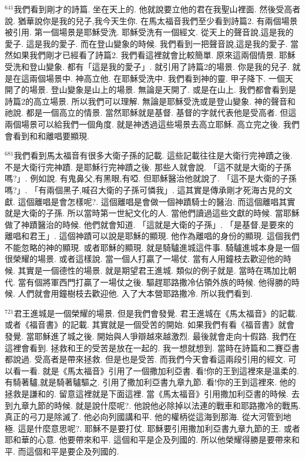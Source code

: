 \documentclass{book}
\begin{document}
$^{641}$我們看到剛才的詩篇.
坐在天上的.
他就說要立他的君在我聖山裡面.
然後受高者說.
猶華說你是我的兒子,我今天生你.
在馬太福音我們至少看到詩篇2.
有兩個場景被引用.
第一個場景是耶穌受洗.
耶穌受洗有一個經文.
從天上的聲音說,這是我的愛子.
這是我的愛子.
而在登山變象的時候.
我們看到一把聲音說,這是我的愛子.
當然如果我們剛才已經看了詩篇2.
我們看這裡就會比較簡單.
原來這兩個情景.
耶穌受洗和登山變象.
都有「這是我的愛子」.
就引用了詩篇2的場景.
你是我的兒子.
就是在這兩個場景中.
神高立他.
在耶穌受洗中.
我們看到神的靈.
甲子降下.
一個天開了的場景.
登山變象是山上的場景.
無論是天開了.
或是在山上.
我們都會看到是詩篇2的高立場景.
所以我們可以理解.
無論是耶穌受洗或是登山變象.
神的聲音和祂說.
都是一個高立的情景.
當然耶穌就是基督.
基督的字就代表他是受高者.
但這兩個場景可以給我們一個角度.
就是神透過這些場景去高立耶穌.
高立完之後.
我們會看到和和離唱要顯現.

$^{681}$我們看到馬太福音有很多大衛子孫的記載.
這些記載往往是大衛行完神蹟之後.
不是大衛行完神蹟.
是耶穌行完神蹟之後.
那些人就會說.
「這不就是大衛的子孫嗎?」.
例如說.
有鬼鼻父,有黑眼,有啞.
但耶穌醫治他就說了.
「這不是大衛的子孫嗎?」.
「有兩個黑子,喊召大衛的子孫可憐我」.
這其實是傳承剛才死海古見的文獻.
這個離唱是會怎樣呢?.
這個離唱是會做一個神蹟騎士的醫治.
而這個離唱其實就是大衛的子孫.
所以當時第一世紀文化的人.
當他們讀過這些文獻的時候.
當耶穌做了神蹟醫治的時候.
他們就會知道.
「這就是大衛的子孫」.
「是基督,是要來的離唱和君王」.
這個神蹟可以說是耶穌的顯現.
他作為離唱的身份的顯現.
這個我們不能忽略的神的顯現.
或者耶穌的顯現.
就是騎驢進城這件事.
騎驢進城本身是一個很榮耀的場景.
或者這樣說.
當一個人打贏了一場仗.
當有人用鐘枝去歡迎他的時候.
其實是一個德性的場景.
就是期望君王進城.
類似的例子就是.
當時在瑪加比朝代.
當有個將軍西門打贏了一場仗之後.
驅趕耶路撒冷佔領外族的時候.
他得勝的時候.
人們就會用鐘樹枝去歡迎他.
入了大本營耶路撒冷.
所以我們看到.

$^{721}$君王進城是一個榮耀的場景.
但是我們會發覺.
君王進城在《馬太福音》的記載.
或者《福音書》的記載.
其實就是一個受苦的開始.
如果我們有看《福音書》就會發覺.
當耶穌進了城之後.
開始與人爭辯越來越激烈.
最後就會走向十假路.
我們在這裡會看到.
拯救和王的受苦是放在一起的.
我一想就想到.
當時在詩篇和二賽亞書都說過.
受高者是帶來拯救.
但是也是受苦.
而我們今天會看這兩段引用的經文.
可以看一看.
就是《馬太福音》引用了一個撒加利亞書.
看!你的王到這裡來是溫柔的.
有騎著驢,就是騎著驢驅之.
引用了撒加利亞書九章九節.
看!你的王到這裡來.
他的拯救是謙和的.
留意這裡就是下面這裡.
當《馬太福音》引用撒加利亞書的時候.
去到九章九節的時候.
就是說什麼呢?.
他說他必除掉以法連的戰車和耶路撒冷的戰馬.
真正的弓刀是除滅了.
他必向列國講和平.
他的權柄從這海到那海.
從大河管到地極.
這是什麼意思呢?.
耶穌不是要打仗.
耶穌要引用撒加利亞書九章九節的王.
或者耶和華的心意.
他要帶來和平.
這個和平是企及列國的.
所以他榮耀得勝是要帶來和平.
而這個和平是要企及列國的.
\end{document}
